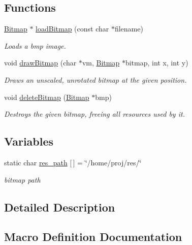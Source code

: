 \subsection*{Functions}
\begin{DoxyCompactItemize}
\item 
\hyperlink{struct_bitmap}{Bitmap} $\ast$ \hyperlink{group___bitmap_ga3506880ffd407c36eb8aaddd2c1606d2}{load\+Bitmap} (const char $\ast$filename)
\begin{DoxyCompactList}\small\item\em Loads a bmp image. \end{DoxyCompactList}\item 
void \hyperlink{group___bitmap_ga9d23448e26cd2737b2dff4df6e886f79}{draw\+Bitmap} (char $\ast$vm, \hyperlink{struct_bitmap}{Bitmap} $\ast$bitmap, int x, int y)
\begin{DoxyCompactList}\small\item\em Draws an unscaled, unrotated bitmap at the given position. \end{DoxyCompactList}\item 
void \hyperlink{group___bitmap_ga08c1d4f4fff81df260d979ea8fc1aa61}{delete\+Bitmap} (\hyperlink{struct_bitmap}{Bitmap} $\ast$bmp)
\begin{DoxyCompactList}\small\item\em Destroys the given bitmap, freeing all resources used by it. \end{DoxyCompactList}\end{DoxyCompactItemize}
\subsection*{Variables}
\begin{DoxyCompactItemize}
\item 
static char \hyperlink{group___bitmap_ga2b225ffd0d59618d1b1fa8396ab6e970}{res\+\_\+path} \mbox{[}$\,$\mbox{]} = \char`\"{}/home/proj/res/\char`\"{}
\begin{DoxyCompactList}\small\item\em bitmap path \end{DoxyCompactList}\end{DoxyCompactItemize}


\subsection{Detailed Description}


\subsection{Macro Definition Documentation}
\mbox{\label{group___bitmap_gabf6f66114c31b8f87c80534ca695a00b}} 

